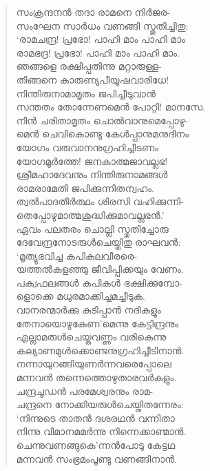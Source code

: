 \begin{verse}
സംക്രന്ദനന്‍ തദാ രാമനെ നിര്‍ജര-\\
സംഘേന സാര്‍ധം വണങ്ങി സ്തുതിച്ചിതു:\\
‘രാമചന്ദ്ര! പ്രഭോ! പാഹി മാം പാഹി മാം\\
രാമഭദ്ര! പ്രഭോ! പാഹി മാം പാഹി മാം.\\
ഞങ്ങളെ രക്ഷിപ്പതിന്നു മറ്റാരുള്ള-\\
തിങ്ങനെ കാരുണ്യപീയൂഷവാരിധേ!\\
നിന്തിരുനാമാമൃതം ജപിച്ചീടുവാന്‍\\
സന്തതം തോന്നേണമെന്‍ പോറ്റി! മാനസേ.\\
നിന്‍ ചരിതാമൃതം ചൊല്‍വാനുമെപ്പോഴു-\\
മെന്‍ ചെവികൊണ്ടു കേള്‍പ്പാനുമനുദിനം\\
യോഗം വരുവാനനുഗ്രഹിച്ചീടണം\\
യോഗമൂര്‍ത്തേ! ജനകാത്മജാവല്ലഭ!\\
ശ്രീമഹാദേവനും നിന്തിരുനാമങ്ങള്‍\\
രാമരാമേതി ജപിക്കുന്നിതന്വഹം.\\
ത്വല്‍പാദതീര്‍ത്ഥം ശിരസി വഹിക്കുന്നി-\\
തെപ്പോഴുമാത്മശുദ്ധിക്കുമാവല്ലഭന്‍.’\\
ഏവം പലതരം ചൊല്ലി സ്തുതിച്ചോരു\\
ദേവേന്ദ്രനോടരുള്‍ചെയ്തിതു രാഘവന്‍:\\
‘മൃത്യുഭവിച്ച കപികുലവീരരെ-\\
യത്തല്‍കളഞ്ഞു ജീവിപ്പിക്കയും വേണം.\\
പക്വഫലങ്ങള്‍ കപികള്‍ ഭക്ഷിക്കുമ്പോ-\\
ളൊക്കെ മധുരമാക്കിച്ചമച്ചീടുക.\\
വാനരന്മാര്‍ക്കു കുടിപ്പാന്‍ നദികളും\\
തേനായൊഴുകേണ’മെന്നു കേട്ടിന്ദ്രനും\\
എല്ലാമരുള്‍ചെയ്തവണ്ണം വരികെന്നു\\
കല്യാണമുള്‍ക്കൊണ്ടനുഗ്രഹിച്ചീടിനാന്‍.\\
നന്നായുറങ്ങിയുണര്‍ന്നവരെപ്പോലെ\\
മന്നവന്‍ തന്നെത്തൊഴുതാരവര്‍കളും.\\
ചന്ദ്രചൂഡന്‍ പരമേശ്വരനും രാമ-\\
ചന്ദ്രനെ നോക്കിയരുള്‍ചെയ്തിതന്നേരം:\\
‘നിന്നുടെ താതന്‍ ദശരഥന്‍ വന്നിതാ\\
നിന്നു വിമാനമമര്‍ന്നു നിന്നെക്കാണ്മാന്‍.\\
ചെന്നുവണങ്ങുകെ’ന്നന്‍പോടു കേട്ടഥ\\
മന്നവന്‍ സംഭ്രമംപൂണ്ടു വണങ്ങിനാന്‍.\\

\end{verse}
